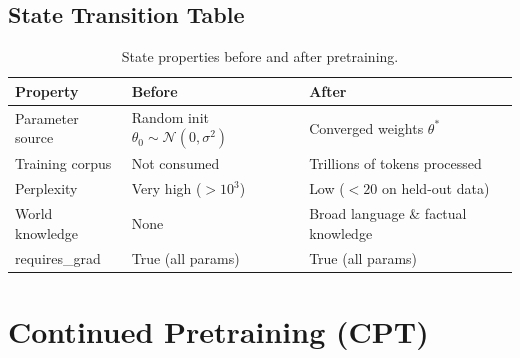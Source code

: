\documentclass{article}
\begin{document}
\subsection{State Transition Table}
\begin{table}[h]\centering
\begin{tabular}{lll}\toprule
\textbf{Property} & \textbf{Before} & \textbf{After}\\\midrule
Parameter source & Random init $\theta_0 \sim \mathcal{N}(0,\sigma^2)$ & Converged weights $\theta^*$\\
Training corpus & Not consumed & Trillions of tokens processed\\
Perplexity & Very high ($>10^3$) & Low ($<20$ on held-out data)\\
World knowledge & None & Broad language \& factual knowledge\\
requires\_grad & True (all params) & True (all params)\\\bottomrule
\end{tabular}
\caption{State properties before and after pretraining.}
\end{table}

\newpage
\section{Continued Pretraining (CPT)}
\end{document}
